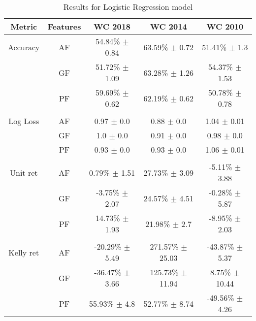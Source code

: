 \begin{table}
    \caption{Results for Logistic Regression model}
    \begin{tabular}{| c  c| c| c| c|}
        \hline
        Metric&Features& \textbf{WC 2018} & \textbf{WC 2014} & \textbf{WC 2010}\\
        \hline
        Accuracy & AF & 54.84\% $\pm$ 0.84 & 63.59\% $\pm$ 0.72 & 51.41\% $\pm$ 1.3 \\
 & GF & 51.72\% $\pm$ 1.09 & 63.28\% $\pm$ 1.26 & 54.37\% $\pm$ 1.53 \\
 & PF & 59.69\% $\pm$ 0.62 & 62.19\% $\pm$ 0.62 & 50.78\% $\pm$ 0.78 \\
 &  & & &  \\
 \hline
Log Loss & AF & 0.97 $\pm$ 0.0 & 0.88 $\pm$ 0.0 & 1.04 $\pm$ 0.01 \\
 & GF & 1.0 $\pm$ 0.0 & 0.91 $\pm$ 0.0 & 0.98 $\pm$ 0.0 \\
 & PF & 0.93 $\pm$ 0.0 & 0.93 $\pm$ 0.0 & 1.06 $\pm$ 0.01 \\
 &  & & &  \\
 \hline
Unit ret & AF & 0.79\% $\pm$ 1.51 & 27.73\% $\pm$ 3.09 & -5.11\% $\pm$ 3.88 \\
 & GF & -3.75\% $\pm$ 2.07 & 24.57\% $\pm$ 4.51 & -0.28\% $\pm$ 5.87 \\
 & PF & 14.73\% $\pm$ 1.93 & 21.98\% $\pm$ 2.7 & -8.95\% $\pm$ 2.03 \\
 &  & & &  \\
 \hline
Kelly ret & AF & -20.29\% $\pm$ 5.49 & 271.57\% $\pm$ 25.03 & -43.87\% $\pm$ 5.37 \\
 & GF & -36.47\% $\pm$ 3.66 & 125.73\% $\pm$ 11.94 & 8.75\% $\pm$ 10.44 \\
 & PF & 55.93\% $\pm$ 4.8 & 52.77\% $\pm$ 8.74 & -49.56\% $\pm$ 4.26 \\
 \hline
    \end{tabular}
    \label{table:onevsrestresults}
\end{table}